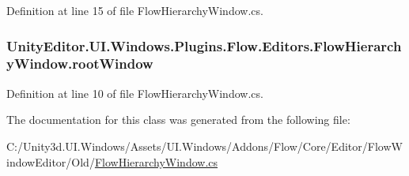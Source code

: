 Definition at line 15 of file Flow\+Hierarchy\+Window.\+cs.

\hypertarget{class_unity_editor_1_1_u_i_1_1_windows_1_1_plugins_1_1_flow_1_1_editors_1_1_flow_hierarchy_window_ad3e04de1b29391ea1a8afd03c7a173b5}{}
\subsubsection[{root\+Window}]{ Unity\+Editor.\+U\+I.\+Windows.\+Plugins.\+Flow.\+Editors.\+Flow\+Hierarchy\+Window.\+root\+Window}\label{class_unity_editor_1_1_u_i_1_1_windows_1_1_plugins_1_1_flow_1_1_editors_1_1_flow_hierarchy_window_ad3e04de1b29391ea1a8afd03c7a173b5}


Definition at line 10 of file Flow\+Hierarchy\+Window.\+cs.



The documentation for this class was generated from the following file\+:\begin{DoxyCompactItemize}
\item 
C\+:/\+Unity3d.\+U\+I.\+Windows/\+Assets/\+U\+I.\+Windows/\+Addons/\+Flow/\+Core/\+Editor/\+Flow\+Window\+Editor/\+Old/\hyperlink{_flow_hierarchy_window_8cs}{Flow\+Hierarchy\+Window.\+cs}\end{DoxyCompactItemize}
